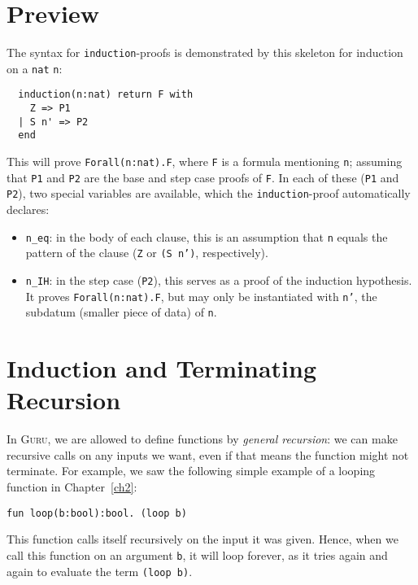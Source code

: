 \documentclass{book}[12pt]
\newcommand{\guru}[0]{\textsc{Guru}\xspace}
\begin{document}
\section{Preview}

The syntax for \texttt{induction}-proofs is demonstrated by this 
skeleton for induction on a \texttt{nat} \texttt{n}:

\begin{verbatim}
  induction(n:nat) return F with
    Z => P1
  | S n' => P2
  end
\end{verbatim}

\noindent This will prove \texttt{Forall(n:nat).F}, where \texttt{F}
is a formula mentioning \texttt{n}; assuming that \texttt{P1} and
\texttt{P2} are the base and step case proofs of \texttt{F}.  In each
of these (\texttt{P1} and \texttt{P2}), two special variables are
available, which the \texttt{induction}-proof automatically declares:

\begin{itemize}
\item \texttt{n\_eq}: in the body of each clause, this is an assumption that
\texttt{n} equals the pattern of the clause (\texttt{Z} or \texttt{(S n')},
respectively).
\item \texttt{n\_IH}: in the step case (\texttt{P2}), this serves as a
proof of the induction hypothesis.  It proves
\texttt{Forall(n:nat).F}, but may only be instantiated with
\texttt{n'}, the subdatum (smaller piece of data) of \texttt{n}.
\end{itemize}


\section{Induction and Terminating Recursion}
\label{ch4:indrec}

In \guru, we are allowed to define functions by \emph{general
recursion}: we can make recursive calls on any inputs we want, even if
that means the function might not terminate.  For example, we saw the
following simple example of a looping function in Chapter~\ref{ch2}:

\begin{verbatim}
fun loop(b:bool):bool. (loop b)
\end{verbatim}

\noindent This function calls itself recursively on the input it was
given.  Hence, when we call this function on an argument \texttt{b},
it will loop forever, as it tries again and again to evaluate
the term \texttt{(loop b)}.
\end{document}
